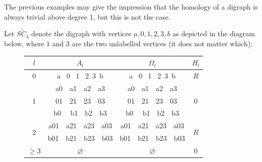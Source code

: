 The previous examples may give the impression that the homology of a digraph is always trivial above degree 1, but this is not the case. 
\begin{example}\label{ex:suspension} 
Let $S\tilde C_4$ denote the digraph with vertices $a, 0, 1, 2, 3, b$ as depicted in the diagram below, where $1$ and $3$ are the two unlabelled vertices (it does not matter which):

    \begin{figure}[H]
        \centering
     \end{figure}
     \begin{figure}[H]
        \centering
        \begin{tabular}{||c||  c | c | c ||} 
         \hline
         $l$ &  $A_l$ & $\Omega_l$ & $H_l$ \\ [.5ex] 
         \hline\hline
        0 &  a \, 0 \, 1 \, 2 \,3\, b & a \, 0 \, 1 \, 2 \,3\, b & $R$ \\ 
         \hline
          & a0\,\,\,\, a1\,\,\,\, a2 \,\,\,\,a3 & a0\,\,\,\, a1\,\,\,\, a2 \,\,\,\,a3 & \\ 
          1 & 01\,\,\,\, 21\,\,\,\, 23 \,\,\,\,03 & 01\,\,\,\, 21\,\,\,\, 23 \,\,\,\,03 & 0\\ 
          & b0 \,\,\,\, b1\,\,\,\, b2\,\,\,\, b3 & b0 \,\,\,\, b1\,\,\,\, b2\,\,\,\, b3 &  \\
         \hline
          \multirow{2}{*}{2} & a01\,\,\,\, a21\,\,\,\, a23 \,\,\,\,a03 & a01\,\,\,\, a21\,\,\,\, a23 \,\,\,\,a03 & \multirow{2}{*}{$R$}\\
            & b01\,\,\,\, b21\,\,\,\, b23 \,\,\,\,b03 & b01\,\,\,\, b21\,\,\,\, b23 \,\,\,\,b03 & \\
         \hline
          $\geq 3$ & $\varnothing$ & $\varnothing$ & 0 \\
         \hline
        \end{tabular}
    \end{figure}  


\end{example}
